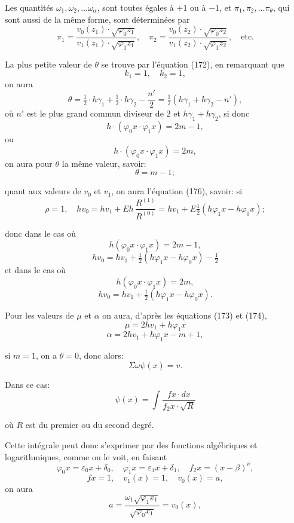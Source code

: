 \documentclass{article}
\begin{document}
Les quantités $\omega_1, \omega_2, \ldots \omega_\alpha$, sont toutes égales à $+1$ ou à $-1$, et $\pi_1, \pi_2, \ldots \pi_\theta$, qui sont aussi de la même forme, sont déterminées par
\[ \pi_1 = \frac{v_0(z_1) \cdot \sqrt{\varphi_0 z_1}}{v_1(z_1) \cdot \sqrt{\varphi_1 z_1}}, \quad \pi_2 = \frac{v_0(z_2) \cdot \sqrt{\varphi_0 z_2}}{v_1(z_2) \cdot \sqrt{\varphi_1 z_2}}, \quad \text{etc.} \]

La plus petite valeur de $\theta$ se trouve par l'équation (172), en remarquant que
\[ k_1 = 1, \quad k_2 = 1, \]
on aura
\[ \theta = \tfrac{1}{2} \cdot h\gamma_1 + \tfrac{1}{2} \cdot h\gamma_2 - \frac{n'}{2} = \tfrac{1}{2}(h\gamma_1+h\gamma_2-n'), \]
où $n'$ est le plus grand commun diviseur de 2 et $h\gamma_1+h\gamma_2$, si donc
\[ h \cdot (\varphi_0 x \cdot \varphi_1 x) = 2m-1, \]
ou
\[ h \cdot (\varphi_0 x \cdot \varphi_1 x) = 2m, \]
on aura pour $\theta$ la même valeur, savoir:
\[ \theta = m-1; \]

quant aux valeurs de $v_0$ et $v_1$, on aura l'équation (176), savoir:
si
\[ \rho = 1, \quad hv_0 = hv_1 + Eh\,\frac{R^{(1)}}{R^{(0)}} = hv_1 + E\tfrac{1}{2}(h\varphi_1 x-h\varphi_0 x); \]

donc dans le cas où
\[ h(\varphi_0 x \cdot \varphi_1 x) = 2m-1, \]
\[ hv_0 = hv_1 + \tfrac{1}{2}(h\varphi_1 x-h\varphi_0 x) - \tfrac{1}{2} \]
et dans le cas où
\[ h(\varphi_0 x \cdot \varphi_1 x) = 2m, \]
\[ hv_0 = hv_1 + \tfrac{1}{2}(h\varphi_1 x-h\varphi_0 x). \]

Pour les valeurs de $\mu$ et $\alpha$ on aura, d'après les équations (173) et (174),
\[ \mu = 2hv_1 + h\varphi_1 x \]
\[ \alpha = 2hv_1 + h\varphi_1 x - m + 1, \]

si $m = 1$, on a $\theta = 0$, donc alors:
\[ \Sigma\omega\psi(x) = v. \]

Dans ce cas:
\[ \psi(x) = \int \frac{f x \cdot dx}{f_2 x \cdot \sqrt{R}} \]

où $R$ est du premier ou du second degré.

Cette intégrale peut donc s'exprimer par des fonctions algébriques et logarithmiques, comme on le voit, en faisant
\[ \varphi_0 x = \varepsilon_0 x + \delta_0, \quad \varphi_1 x = \varepsilon_1 x + \delta_1, \quad f_2 x = (x-\beta)^{\nu}, \]
\[ f x = 1, \quad v_1(x) = 1, \quad v_0(x) = a, \]
on aura
\[ a = \frac{\omega_1\sqrt{\varphi_1 x_1}}{\sqrt{\varphi_0 x_1}} = v_0(x), \]
\end{document}
